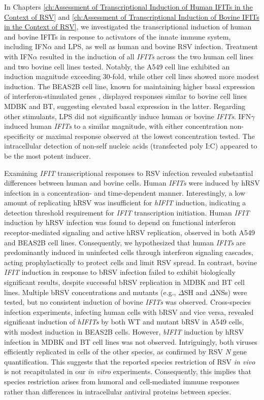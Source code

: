 In Chapters \ref{ch:Assessment of Transcriptional Induction of Human IFITs in the Context of RSV} and \ref{ch:Assessment of Transcriptional Induction of Bovine IFITs in the Context of RSV}, we investigated the transcriptional induction of human and bovine IFITs in response to activators of the innate immune system, including IFN\(\alpha\) and LPS, as well as human and bovine RSV infection. Treatment with IFN\(\alpha\) resulted in the induction of all \textit{IFITs} across the two human cell lines and two bovine cell lines tested. Notably, the A549 cell line exhibited an induction magnitude exceeding 30-fold, while other cell lines showed more modest induction. The BEAS2B cell line, known for maintaining higher basal expression of interferon-stimulated genes \cite{Seng2014HighResistance}, displayed responses similar to bovine cell lines MDBK and BT, suggesting elevated basal expression in the latter. Regarding other stimulants, LPS did not significantly induce human or bovine \textit{IFITs}. IFN\(\gamma\) induced human \textit{IFITs} to a similar magnitude, with either concentration non-specificity or maximal response observed at the lowest concentration tested. The intracellular detection of non-self nucleic acids (transfected poly I:C) appeared to be the most potent inducer.

Examining \textit{IFIT} transcriptional responses to RSV infection revealed substantial differences between human and bovine cells. Human \textit{IFITs} were induced by hRSV infection in a concentration- and time-dependent manner. Interestingly, a low amount of replicating hRSV was insufficient for \textit{hIFIT} induction, indicating a detection threshold requirement for \textit{IFIT} transcription initiation. Human \textit{IFIT} induction by hRSV infection was found to depend on functional interferon receptor-mediated signaling and active hRSV replication, observed in both A549 and BEAS2B cell lines. Consequently, we hypothesized that human \textit{IFITs} are predominantly induced in uninfected cells through interferon signaling cascades, acting prophylactically to protect cells and limit RSV spread. In contrast, bovine \textit{IFIT} induction in response to bRSV infection failed to exhibit biologically significant results, despite successful bRSV replication in MDBK and BT cell lines. Multiple bRSV concentrations and mutants (e.g., $\Delta$SH and $\Delta$NSs) were tested, but no consistent induction of bovine \textit{IFITs} was observed. Cross-species infection experiments, infecting human cells with bRSV and vice versa, revealed significant induction of \textit{hIFITs} by both WT and mutant bRSV in A549 cells, with modest induction in BEAS2B cells. However, \textit{bIFIT} induction by hRSV infection in MDBK and BT cell lines was not observed. Intriguingly, both viruses efficiently replicated in cells of the other species, as confirmed by RSV \textit{N} gene quantification. This suggests that the reported species restriction of RSV \textit{in vivo} is not recapitulated in our \textit{in vitro} experiments. Consequently, this implies that species restriction arises from humoral and cell-mediated immune responses rather than differences in intracellular antiviral proteins between species.

